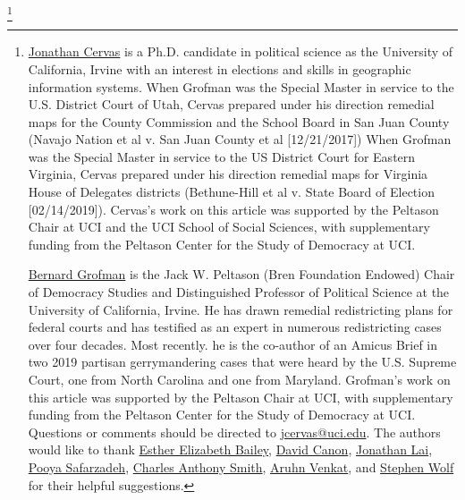 \documentclass[12pt, a4paper, twoside]{article}
\begin{document}
    \thanks{\href{https://www.jonathancervas.com}{Jonathan Cervas} is a Ph.D. candidate in political science as the University of California, Irvine with an interest in elections and skills in geographic information systems. When Grofman was the Special Master in service to the U.S. District Court of Utah, Cervas prepared under his direction remedial maps for the County Commission and the School Board in San Juan County (Navajo Nation et al v. San Juan County et al [12/21/2017]) When Grofman was the Special Master in service to the US District Court for Eastern Virginia, Cervas prepared under his direction remedial maps for Virginia House of Delegates districts (Bethune-Hill et al v. State Board of Election [02/14/2019]). Cervas’s work on this article was supported by the Peltason Chair at UCI and the UCI School of Social Sciences, with supplementary funding from the Peltason Center for the Study of Democracy at UCI.

    \href{http://www.socsci.uci.edu/~bgrofman/}{Bernard Grofman} is the Jack W. Peltason (Bren Foundation Endowed) Chair of Democracy Studies and Distinguished Professor of Political Science at the University of California, Irvine. He has drawn remedial redistricting plans for federal courts and has testified as an expert in numerous redistricting cases over four decades. Most recently. he is the co-author of an Amicus Brief in two 2019 partisan gerrymandering cases that were heard by the U.S. Supreme Court, one from North Carolina and one from Maryland. Grofman’s work on this article was supported by the Peltason Chair at UCI, with supplementary funding from the Peltason Center for the Study of Democracy at UCI. \\

    Questions or comments should be directed to \url{jcervas@uci.edu}. The authors would like to thank \href{https://www.linkedin.com/in/esther-bailey-9289391a/}{Esther Elizabeth Bailey}, \href{https://polisci.wisc.edu/people/faculty/david-canon}{David Canon}, \href{http://www.philly.com/archive/jonathan_lai/}{Jonathan Lai}, \href{mailto:psafarza@uci.edu}{Pooya Safarzadeh}, \href{https://www.faculty.uci.edu/profile.cfm?faculty_id=5443}{Charles Anthony Smith}, \href{https://twitter.com/aruhnv?lang=en}{Aruhn Venkat}, and \href{https://www.dailykos.com/user/Stephen Wolf}{Stephen Wolf} for their helpful suggestions.}
        \maketitle
\end{document}
